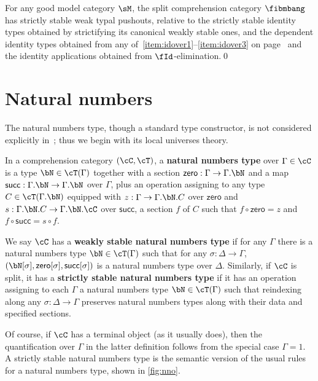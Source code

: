 \documentclass{amsart}
\let\C\cC
\let\T\cT
\def\zero{\mathsf{zero}}
\def\succ{\mathsf{succ}}
\let\Id\fId
\begin{document}
\begin{cor}
  For any good model category $\sM$, the split comprehension category $\fibmbang$ has strictly stable weak typal pushouts, relative to the strictly stable identity types obtained by strictifying its canonical weakly stable ones, and the dependent identity types obtained from any of~\ref{item:idover1}--\ref{item:idover3} on page~\pageref{idover} and the identity applications obtained from $\Id$-elimination.\qed
\end{cor}

\section{Natural numbers}
\label{sec:natural-numbers}

The natural numbers type, though a standard type constructor, is not considered explicitly in~\cite{lw:localuniv}; thus we begin with its local universes theory.

\begin{defn}
  In a comprehension category $(\C,\T)$, a \textbf{natural numbers type} over $\Gamma\in\C$ is a type $\bN\in\T(\Gamma)$ together with a section $\zero:\Gamma\to\Gamma.\bN$ and a map $\succ:\Gamma.\bN\to\Gamma.\bN$ over $\Gamma$, plus an operation assigning to any type $C\in\T(\Gamma.\bN)$ equipped with $z:\Gamma\to\Gamma.\bN.C$ over $\zero$ and $s:\Gamma.\bN.C \to \Gamma.\bN.\C$ over $\succ$, a section $f$ of $C$ such that $f \circ \zero = z$ and $f\circ \succ = s \circ f$.

  We say $\C$ has a \textbf{weakly stable natural numbers type} if for any $\Gamma$ there is a natural numbers type $\bN\in\T(\Gamma)$ such that for any $\sigma:\Delta\to\Gamma$, $(\bN[\sigma],\zero[\sigma],\succ[\sigma])$ is a natural numbers type over $\Delta$.
  Similarly, if $\C$ is split, it has a \textbf{strictly stable natural numbers type} if it has an operation assigning to each $\Gamma$ a natural numbers type $\bN\in\T(\Gamma)$ such that reindexing along any $\sigma:\Delta\to\Gamma$ preserves natural numbers types along with their data and specified sections.
\end{defn}

Of course, if $\C$ has a terminal object (as it usually does), then the quantification over $\Gamma$ in the latter definition follows from the special case $\Gamma=1$.
A strictly stable natural numbers type is the semantic version of the usual rules for a natural numbers type, shown in \cref{fig:nno}.
\end{document}
